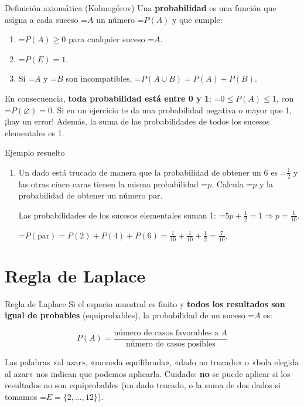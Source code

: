 \documentclass[11pt,a4paper]{article}
\newcommand{\fmm}[1]{\setbox0=\hbox{$#1$}\ifdim\wd0>\linewidth\[#1\]\else\mbox{\box0}\fi}
\newcommand{\fmpau}[1]{\tcbox[on line,colback=fmnavy,colframe=fmnavy,arc=2mm,boxsep=0pt,left=4pt,right=4pt,top=1.5pt,bottom=1.5pt]{\color{white}\scriptsize\bfseries\MakeUppercase{#1}}\ }
\begin{document}
  
\begin{fmdef}{Definición axiomática (Kolmogórov)}
Una \textbf{probabilidad} es una función que asigna a cada suceso \fmm{A} un número \fmm{P(A)} y que cumple:

      
\begin{enumerate}
\item \fmm{P(A)\geq0} para cualquier suceso \fmm{A}.
\item \fmm{P(E)=1}.
\item Si \fmm{A} y \fmm{B} son incompatibles, \fmm{P(A\cup B)=P(A)+P(B)}.
\end{enumerate}

      
\begin{fmnote}En consecuencia, \textbf{toda probabilidad está entre 0 y 1}: \fmm{0\leq P(A)\leq1}, con \fmm{P(\varnothing)=0}. Si en un ejercicio te da una probabilidad negativa o mayor que 1, ¡hay un error! Además, la suma de las probabilidades de todos los sucesos elementales es 1.\end{fmnote}
\end{fmdef}

  
\begin{fmex}{Ejemplo resuelto}
\begin{enumerate}[label=\textbf{\arabic*.},leftmargin=*]
\item Un dado está trucado de manera que la probabilidad de obtener un 6 es \fmm{\frac12} y las otras cinco caras tienen la misma probabilidad \fmm{p}. Calcula \fmm{p} y la probabilidad de obtener un número par. \fmpau{PAU}
          

            

Las probabilidades de los sucesos elementales suman 1: \fmm{5p+\frac12=1\Rightarrow p=\frac{1}{10}}.

            

\fmm{P(\text{par})=P(2)+P(4)+P(6)=\frac1{10}+\frac1{10}+\frac12=\frac{7}{10}}.
\end{enumerate}
\end{fmex}

\section{Regla de Laplace}\hypertarget{sec4}{}

  

  
\begin{fmprop}{Regla de Laplace}
Si el espacio muestral es finito y \textbf{todos los resultados son igual de probables} (equiprobables), la probabilidad de un suceso \fmm{A} es:

      
\[P(A)=\frac{\text{número de casos favorables a }A}{\text{número de casos posibles}}\]

      

Las palabras «al azar», «moneda equilibrada», «dado no trucado» o «bola elegida al azar» nos indican que podemos aplicarla. Cuidado: \textbf{no} se puede aplicar si los resultados no son equiprobables (un dado trucado, o la suma de dos dados si tomamos \fmm{E=\{2,\dots,12\}}).
\end{fmprop}
\end{document}
